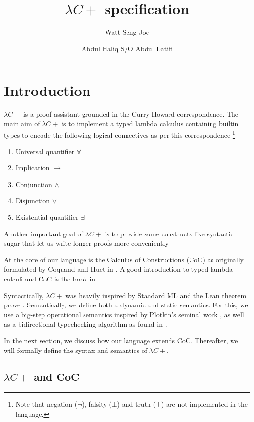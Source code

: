 \documentclass{article}
\title{$\lambda C+$ specification}
\author{Watt Seng Joe \and Abdul Haliq S/O Abdul Latiff}
\begin{document}
\maketitle
\tableofcontents
\newpage

\section{Introduction}
$\lambda C+$ is a proof assistant grounded in the Curry-Howard correspondence.
The main aim of $\lambda C+$ is to implement a typed lambda calculus containing
builtin types to encode the following logical connectives as per this
correspondence
\footnote{
  Note that negation ($\neg$), falsity ($\bot$) and truth ($\top$) are not
  implemented in the language.
}

\begin{enumerate}
  \item Universal quantifier $\forall$
  \item Implication $\rightarrow$
  \item Conjunction $\wedge$
  \item Disjunction $\vee$ 
  \item Existential quantifier $\exists$
\end{enumerate}

Another important goal of $\lambda C+$ is to provide some constructs
like syntactic sugar that let us write longer proofs more conveniently.

At the core of our language is the Calculus of Constructions (CoC) as 
originally formulated by Coquand and Huet in \cite{coc_coquand_huet}.
A good introduction to typed lambda calculi and CoC is the book in 
\cite{type_theory_and_formal_proof}.

Syntactically, $\lambda C+$ was heavily inspired by Standard ML and the
\href{https://leanprover.github.io/}{Lean theorem prover}.
Semantically, we define both a dynamic and static semantics.
For this, we use a big-step operational semantics inspired by
Plotkin's seminal work \cite{plotkin_sos}, as well as a bidirectional typechecking
algorithm as found in \cite{lambdapi}. 

In the next section, we discuss how our language extends CoC. Thereafter, we
will formally define the syntax and semantics of $\lambda C+$.

\subsection{
  \texorpdfstring{$\lambda C+$}{Lambdacplus} and CoC
}
\end{document}
